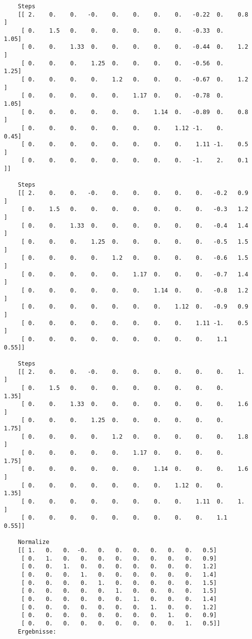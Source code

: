 \documentclass{article}
\begin{document}
\begin{lstlisting}
    Steps
    [[ 2.    0.    0.   -0.    0.    0.    0.    0.   -0.22  0.    0.8 ]
     [ 0.    1.5   0.    0.    0.    0.    0.    0.   -0.33  0.    1.05]
     [ 0.    0.    1.33  0.    0.    0.    0.    0.   -0.44  0.    1.2 ]
     [ 0.    0.    0.    1.25  0.    0.    0.    0.   -0.56  0.    1.25]
     [ 0.    0.    0.    0.    1.2   0.    0.    0.   -0.67  0.    1.2 ]
     [ 0.    0.    0.    0.    0.    1.17  0.    0.   -0.78  0.    1.05]
     [ 0.    0.    0.    0.    0.    0.    1.14  0.   -0.89  0.    0.8 ]
     [ 0.    0.    0.    0.    0.    0.    0.    1.12 -1.    0.    0.45]
     [ 0.    0.    0.    0.    0.    0.    0.    0.    1.11 -1.    0.5 ]
     [ 0.    0.    0.    0.    0.    0.    0.    0.   -1.    2.    0.1 ]]
     
    Steps
    [[ 2.    0.    0.   -0.    0.    0.    0.    0.    0.   -0.2   0.9 ]
     [ 0.    1.5   0.    0.    0.    0.    0.    0.    0.   -0.3   1.2 ]
     [ 0.    0.    1.33  0.    0.    0.    0.    0.    0.   -0.4   1.4 ]
     [ 0.    0.    0.    1.25  0.    0.    0.    0.    0.   -0.5   1.5 ]
     [ 0.    0.    0.    0.    1.2   0.    0.    0.    0.   -0.6   1.5 ]
     [ 0.    0.    0.    0.    0.    1.17  0.    0.    0.   -0.7   1.4 ]
     [ 0.    0.    0.    0.    0.    0.    1.14  0.    0.   -0.8   1.2 ]
     [ 0.    0.    0.    0.    0.    0.    0.    1.12  0.   -0.9   0.9 ]
     [ 0.    0.    0.    0.    0.    0.    0.    0.    1.11 -1.    0.5 ]
     [ 0.    0.    0.    0.    0.    0.    0.    0.    0.    1.1   0.55]]
     
    Steps
    [[ 2.    0.    0.   -0.    0.    0.    0.    0.    0.    0.    1.  ]
     [ 0.    1.5   0.    0.    0.    0.    0.    0.    0.    0.    1.35]
     [ 0.    0.    1.33  0.    0.    0.    0.    0.    0.    0.    1.6 ]
     [ 0.    0.    0.    1.25  0.    0.    0.    0.    0.    0.    1.75]
     [ 0.    0.    0.    0.    1.2   0.    0.    0.    0.    0.    1.8 ]
     [ 0.    0.    0.    0.    0.    1.17  0.    0.    0.    0.    1.75]
     [ 0.    0.    0.    0.    0.    0.    1.14  0.    0.    0.    1.6 ]
     [ 0.    0.    0.    0.    0.    0.    0.    1.12  0.    0.    1.35]
     [ 0.    0.    0.    0.    0.    0.    0.    0.    1.11  0.    1.  ]
     [ 0.    0.    0.    0.    0.    0.    0.    0.    0.    1.1   0.55]]
     
    Normalize
    [[ 1.   0.   0.  -0.   0.   0.   0.   0.   0.   0.   0.5]
     [ 0.   1.   0.   0.   0.   0.   0.   0.   0.   0.   0.9]
     [ 0.   0.   1.   0.   0.   0.   0.   0.   0.   0.   1.2]
     [ 0.   0.   0.   1.   0.   0.   0.   0.   0.   0.   1.4]
     [ 0.   0.   0.   0.   1.   0.   0.   0.   0.   0.   1.5]
     [ 0.   0.   0.   0.   0.   1.   0.   0.   0.   0.   1.5]
     [ 0.   0.   0.   0.   0.   0.   1.   0.   0.   0.   1.4]
     [ 0.   0.   0.   0.   0.   0.   0.   1.   0.   0.   1.2]
     [ 0.   0.   0.   0.   0.   0.   0.   0.   1.   0.   0.9]
     [ 0.   0.   0.   0.   0.   0.   0.   0.   0.   1.   0.5]]
    Ergebnisse:


\end{lstlisting}
\end{document}
